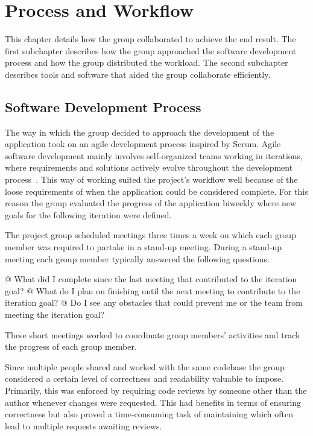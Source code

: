 \section{Process and Workflow}
This chapter details how the group collaborated to achieve the end result.
The first subchapter describes how the group approached the software development process and how the group distributed the workload.
The second subchapter describes tools and software that aided the group collaborate efficiently. 

\subsection{Software Development Process}
The way in which the group decided to approach the development of the application took on an agile development process inspired by Scrum.
Agile software development mainly involves self-organized teams working in iterations, where requirements and solutions actively evolve throughout the development process~\cite{agile101}.
This way of working suited the project's workflow well because of the loose requirements of when the application could be considered complete.
For this reason the group evaluated the progress of the application biweekly where new goals for the following iteration were defined.

The project group scheduled meetings three times a week on which each group member was required to partake in a stand-up meeting.
During a stand-up meeting each group member typically answered the following questions.

\begin{easylist}
  @ What did I complete since the last meeting that contributed to the iteration goal?
  @ What do I plan on finishing until the next meeting to contribute to the iteration goal?
  @ Do I see any obstacles that could prevent me or the team from meeting the iteration goal?
\end{easylist}

These short meetings worked to coordinate group members' activities and track the progress of each group member.

Since multiple people shared and worked with the same codebase the group considered a certain level of correctness and readability valuable to impose.
Primarily, this was enforced by requiring code reviews by someone other than the author whenever changes were requested.
This had benefits in terms of ensuring correctness but also proved a time-consuming task of maintaining which often lead to multiple requests awaiting reviews.


